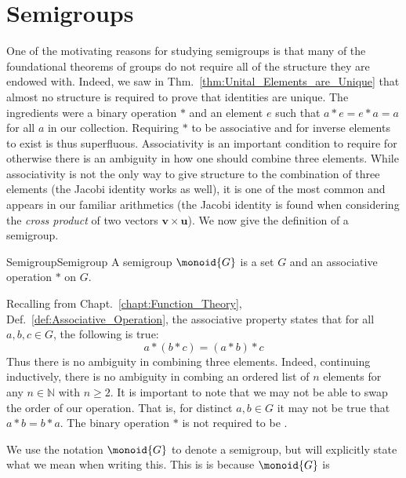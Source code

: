 \section{Semigroups}
    One of the motivating reasons for studying semigroups is that many of the
    foundational theorems of groups do not require all of the structure they are
    endowed with. Indeed, we saw in Thm.~\ref{thm:Unital_Elements_are_Unique}
    that almost no structure is required to prove that identities are unique.
    The ingredients were a binary operation $*$ and an element $e$ such that
    $a*e=e*a=a$ for all $a$ in our collection. Requiring $*$ to be associative
    and for inverse elements to exist is thus superfluous. Associativity is an
    important condition to require for otherwise there is an ambiguity in how
    one should combine three elements. While associativity is not the only way
    to give structure to the combination of three elements (the Jacobi identity
    works as well), it is one of the most common and
    appears in our familiar arithmetics (the Jacobi identity is found when
    considering the \textit{cross product} of two vectors
    $\mathbf{v}\times\mathbf{u}$). We now give the
    definition of a semigroup.
    \begin{fdefinition}{Semigroup}{Semigroup}
        A \gls{semigroup} $\monoid{G}$ is a set $G$ and an
        \gls{associative operation} $*$ on $G$.
    \end{fdefinition}
    Recalling from Chapt.~\ref{chapt:Function_Theory},
    Def.~\ref{def:Associative_Operation}, the associative property states that
    for all $a,b,c\in{G}$, the following is true:
    \begin{equation}
        a*(b*c)=(a*b)*c
    \end{equation}
    Thus there is no ambiguity in combining three elements. Indeed, continuing
    inductively, there is no ambiguity in combing an ordered list of $n$
    elements for any $n\in\mathbb{N}$ with $n\geq{2}$. It is important to note
    that we may not be able to swap the order of our operation. That is, for
    distinct $a,b\in{G}$ it may not be true that $a*b=b*a$. The binary operation
    $*$ is not required to be 
    .
    \par\hfill\par
    We use the notation $\monoid{G}$ to denote a semigroup, but will explicitly
    state what we mean when writing this. This is is because $\monoid{G}$ is
